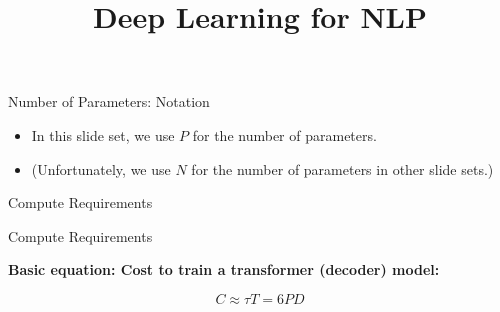 \documentclass[11pt,compress,t,notes=noshow, xcolor=table]{beamer}
\title{Deep Learning for NLP}
\begin{document}








\begin{vbframe}{Number of Parameters: Notation}

\vfill

\begin{itemize}
\item In this slide set, we use $P$ for the number of parameters.
\item (Unfortunately,  we use $N$ for the number of
  parameters in other slide sets.)
\end{itemize}

\vfill
    
\end{vbframe}

\begin{vbframe}{Compute Requirements}
\end{vbframe}
\begin{vbframe}{Compute Requirements}

\vfill

\textbf{Basic equation: Cost to train a transformer (decoder) model:}

\vspace{1.5cm}

$$C \approx \tau T = 6 P D$$ 

\vspace{1.5cm}

\centering {}

\vfill

\end{vbframe}

\end{document}
